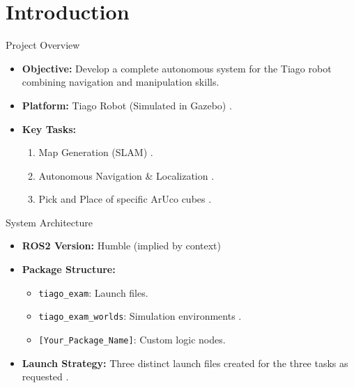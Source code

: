 \section{Introduction}

\begin{frame}{Project Overview}
    \begin{itemize}
        \item \textbf{Objective:} Develop a complete autonomous system for the Tiago robot combining navigation and manipulation skills.
        \item \textbf{Platform:} Tiago Robot (Simulated in Gazebo) \cite{43}.
        \item \textbf{Key Tasks:}
            \begin{enumerate}
                \item Map Generation (SLAM) \cite{78}.
                \item Autonomous Navigation \& Localization \cite{92}.
                \item Pick and Place of specific ArUco cubes \cite{113}.
            \end{enumerate}
    \end{itemize}
\end{frame}

\begin{frame}{System Architecture}
    \begin{itemize}
        \item \textbf{ROS2 Version:} Humble (implied by context)
        \item \textbf{Package Structure:}
            \begin{itemize}
                \item \texttt{tiago\_exam}: Launch files.
                \item \texttt{tiago\_exam\_worlds}: Simulation environments \cite{35}.
                \item \texttt{[Your\_Package\_Name]}: Custom logic nodes.
            \end{itemize}
        \item \textbf{Launch Strategy:} Three distinct launch files created for the three tasks as requested \cite{126}.
    \end{itemize}
\end{frame}